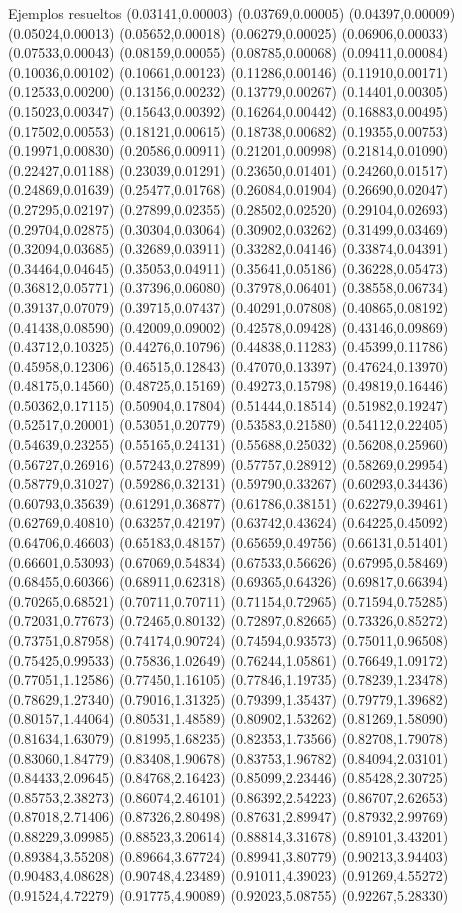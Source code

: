 \documentclass[11pt,a4paper]{article}
\begin{document}
\begin{fmex}{Ejemplos resueltos}
(0.03141,0.00003) (0.03769,0.00005) (0.04397,0.00009) (0.05024,0.00013) (0.05652,0.00018) (0.06279,0.00025) (0.06906,0.00033) (0.07533,0.00043) (0.08159,0.00055) (0.08785,0.00068) (0.09411,0.00084) (0.10036,0.00102) (0.10661,0.00123) (0.11286,0.00146) (0.11910,0.00171) (0.12533,0.00200) (0.13156,0.00232) (0.13779,0.00267) (0.14401,0.00305) (0.15023,0.00347) (0.15643,0.00392) (0.16264,0.00442) (0.16883,0.00495) (0.17502,0.00553) (0.18121,0.00615) (0.18738,0.00682) (0.19355,0.00753) (0.19971,0.00830) (0.20586,0.00911) (0.21201,0.00998) (0.21814,0.01090) (0.22427,0.01188) (0.23039,0.01291) (0.23650,0.01401) (0.24260,0.01517) (0.24869,0.01639) (0.25477,0.01768) (0.26084,0.01904) (0.26690,0.02047) (0.27295,0.02197) (0.27899,0.02355) (0.28502,0.02520) (0.29104,0.02693) (0.29704,0.02875) (0.30304,0.03064) (0.30902,0.03262) (0.31499,0.03469) (0.32094,0.03685) (0.32689,0.03911) (0.33282,0.04146) (0.33874,0.04391) (0.34464,0.04645) (0.35053,0.04911) (0.35641,0.05186) (0.36228,0.05473) (0.36812,0.05771) (0.37396,0.06080) (0.37978,0.06401) (0.38558,0.06734) (0.39137,0.07079) (0.39715,0.07437) (0.40291,0.07808) (0.40865,0.08192) (0.41438,0.08590) (0.42009,0.09002) (0.42578,0.09428) (0.43146,0.09869) (0.43712,0.10325) (0.44276,0.10796) (0.44838,0.11283) (0.45399,0.11786) (0.45958,0.12306) (0.46515,0.12843) (0.47070,0.13397) (0.47624,0.13970) (0.48175,0.14560) (0.48725,0.15169) (0.49273,0.15798) (0.49819,0.16446) (0.50362,0.17115) (0.50904,0.17804) (0.51444,0.18514) (0.51982,0.19247) (0.52517,0.20001) (0.53051,0.20779) (0.53583,0.21580) (0.54112,0.22405) (0.54639,0.23255) (0.55165,0.24131) (0.55688,0.25032) (0.56208,0.25960) (0.56727,0.26916) (0.57243,0.27899) (0.57757,0.28912) (0.58269,0.29954) (0.58779,0.31027) (0.59286,0.32131) (0.59790,0.33267) (0.60293,0.34436) (0.60793,0.35639) (0.61291,0.36877) (0.61786,0.38151) (0.62279,0.39461) (0.62769,0.40810) (0.63257,0.42197) (0.63742,0.43624) (0.64225,0.45092) (0.64706,0.46603) (0.65183,0.48157) (0.65659,0.49756) (0.66131,0.51401) (0.66601,0.53093) (0.67069,0.54834) (0.67533,0.56626) (0.67995,0.58469) (0.68455,0.60366) (0.68911,0.62318) (0.69365,0.64326) (0.69817,0.66394) (0.70265,0.68521) (0.70711,0.70711) (0.71154,0.72965) (0.71594,0.75285) (0.72031,0.77673) (0.72465,0.80132) (0.72897,0.82665) (0.73326,0.85272) (0.73751,0.87958) (0.74174,0.90724) (0.74594,0.93573) (0.75011,0.96508) (0.75425,0.99533) (0.75836,1.02649) (0.76244,1.05861) (0.76649,1.09172) (0.77051,1.12586) (0.77450,1.16105) (0.77846,1.19735) (0.78239,1.23478) (0.78629,1.27340) (0.79016,1.31325) (0.79399,1.35437) (0.79779,1.39682) (0.80157,1.44064) (0.80531,1.48589) (0.80902,1.53262) (0.81269,1.58090) (0.81634,1.63079) (0.81995,1.68235) (0.82353,1.73566) (0.82708,1.79078) (0.83060,1.84779) (0.83408,1.90678) (0.83753,1.96782) (0.84094,2.03101) (0.84433,2.09645) (0.84768,2.16423) (0.85099,2.23446) (0.85428,2.30725) (0.85753,2.38273) (0.86074,2.46101) (0.86392,2.54223) (0.86707,2.62653) (0.87018,2.71406) (0.87326,2.80498) (0.87631,2.89947) (0.87932,2.99769) (0.88229,3.09985) (0.88523,3.20614) (0.88814,3.31678) (0.89101,3.43201) (0.89384,3.55208) (0.89664,3.67724) (0.89941,3.80779) (0.90213,3.94403) (0.90483,4.08628) (0.90748,4.23489) (0.91011,4.39023) (0.91269,4.55272) (0.91524,4.72279) (0.91775,4.90089) (0.92023,5.08755) (0.92267,5.28330) 
\end{fmex}
\end{document}
